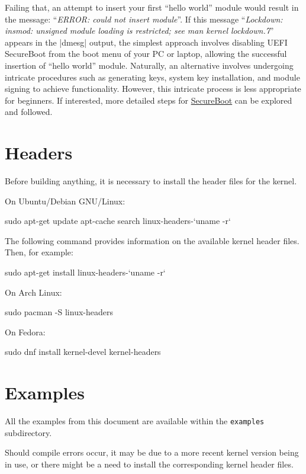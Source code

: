 \documentclass[10pt, oneside]{book}
\begin{document}
\begin{enumerate}
        Failing that, an attempt to insert your first ``hello world'' module would result in the message: ``\emph{ERROR: could not insert module}''.
        If this message ``\emph{Lockdown: insmod: unsigned module loading is restricted;
        see man kernel lockdown.7}'' appears in the \sh|dmesg| output,
        the simplest approach involves disabling UEFI SecureBoot from the boot menu of your PC or laptop,
        allowing the successful insertion of ``hello world'' module.
        Naturally, an alternative involves undergoing intricate procedures such as generating keys, system key installation,
        and module signing to achieve functionality.
        However, this intricate process is less appropriate for beginners. If interested,
        more detailed steps for \href{https://wiki.debian.org/SecureBoot}{SecureBoot} can be explored and followed.
\end{enumerate}

\section{Headers}
\label{sec:headers}
Before building anything, it is necessary to install the header files for the kernel.

On Ubuntu/Debian GNU/Linux:
\begin{codebash}
sudo apt-get update
apt-cache search linux-headers-`uname -r`
\end{codebash}

The following command provides information on the available kernel header files.
Then, for example:
\begin{codebash}
sudo apt-get install linux-headers-`uname -r`
\end{codebash}

On Arch Linux:
\begin{codebash}
sudo pacman -S linux-headers
\end{codebash}

On Fedora:
\begin{codebash}
sudo dnf install kernel-devel kernel-headers
\end{codebash}

\section{Examples}
\label{sec:examples}
All the examples from this document are available within the \verb|examples| subdirectory.

Should compile errors occur, it may be due to a more recent kernel version being in use,
or there might be a need to install the corresponding kernel header files.
\end{document}
